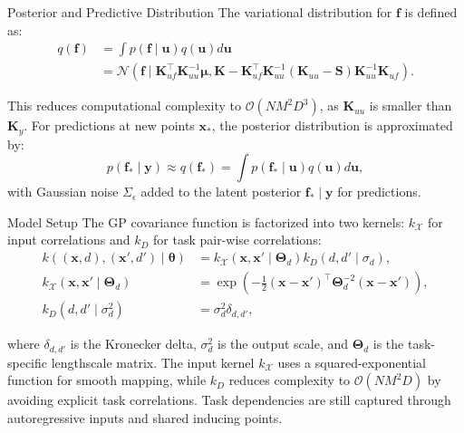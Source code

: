 \begin{frame}{Posterior and Predictive Distribution}
	The variational distribution for $\mathbf{f}$ is defined as:
	\begin{align*}
		q(\mathbf{f}) &= \int p(\mathbf{f} \mid \mathbf{u}) q(\mathbf{u}) d\mathbf{u} \nonumber \\
		&= \mathcal{N}\left(\mathbf{f} \mid \mathbf{K}_{uf}^\top \mathbf{K}_{uu}^{-1} \boldsymbol{\mu}, \mathbf{K} - \mathbf{K}_{uf}^\top \mathbf{K}_{uu}^{-1}(\mathbf{K}_{uu} - \mathbf{S})\mathbf{K}_{uu}^{-1}\mathbf{K}_{uf}\right).
	\end{align*}
	
	This reduces computational complexity to $\mathcal{O}(NM^2D^3)$, as $\mathbf{K}_{uu}$ is smaller than $\mathbf{K}_y$. For predictions at new points $\mathbf{x}_*$, the posterior distribution is approximated by:
	\begin{equation*}
		p(\mathbf{f}_* \mid \mathbf{y}) \approx q(\mathbf{f}_*) = \int p(\mathbf{f}_* \mid \mathbf{u}) q(\mathbf{u}) d\mathbf{u},
	\end{equation*}
	with Gaussian noise $\Sigma_\epsilon$ added to the latent posterior $\mathbf{f}_* \mid \mathbf{y}$ for predictions.
\end{frame}

\begin{frame}{Model Setup}
	The GP covariance function is factorized into two kernels: $k_{\mathcal{X}}$ for input correlations and $k_{D}$ for task pair-wise correlations:
	\begin{align*}
		k\left((\bm{x}, d), (\bm{x}', d') \mid \bm{\theta}\right) &= k_{\mathcal{X}}\left(\bm{x}, \bm{x}' \mid \bm{\Theta}_d \right) k_{D}\left(d, d' \mid \sigma_d \right), \\
		k_{\mathcal{X}}\left(\bm{x}, \bm{x}' \mid \bm{\Theta}_d \right) &= \exp\left(-\frac{1}{2}(\bm{x} - \bm{x}')^\top \bm{\Theta}_d^{-2} (\bm{x} - \bm{x}')\right), \\
		k_{D}\left(d, d' \mid \sigma^2_d \right) &= \sigma^2_d \delta_{d, d'},
	\end{align*}
	
	where $\delta_{d, d'}$ is the Kronecker delta, $\sigma^2_d$ is the output scale, and $\bm{\Theta}_d$ is the task-specific lengthscale matrix. The input kernel $k_{\mathcal{X}}$ uses a squared-exponential function for smooth mapping, while $k_{D}$ reduces complexity to $\mathcal{O}(NM^2D)$ by avoiding explicit task correlations. Task dependencies are still captured through autoregressive inputs and shared inducing points.
\end{frame}


